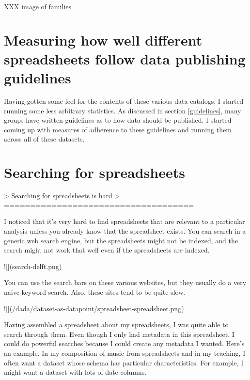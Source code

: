 \documentclass{acm_proc_article-sp}
\begin{document}
XXX image of families




\section{Measuring how well different spreadsheets follow data publishing guidelines}
Having gotten some feel for the contents of these various data catalogs,
I started running some less arbitrary statistics.
As discussed in section \ref{guidelines}, many groups have written guidelines
as to how data should be published.
\cite{open-data-census,fivestars,sunlight,sebastopol,odi}
I started coming up with measures of adherence to these guidelines and running
them across all of these datasets.










\section{Searching for spreadsheets}


















> Searching for spreadsheets is hard
> ====================================

I noticed that it's very hard to find spreadsheets that are relevant
to a particular analysis unless you already know that the spreadsheet exists.
You can search in a generic web search engine, but the spreadsheets might not
be indexed, and the search might not work that well even if the spreadsheets
are indexed.

![](search-delft.png)

You can use the search bars on these various websites, but they usually do a
very naive keyword search. Also, these sites tend to be quite slow.

![](/dada/dataset-as-datapoint/spreadsheet-spreadsheet.png)

Having assembled a spreadsheet about my spreadsheets, I was quite able to
search through them. Even though I only had metadata in this spreadsheet,
I could do powerful searches because I could create any metadata I wanted.
Here's an example. In my composition of music from spreadsheets and in my
teaching, I often want a dataset whose schema has particular characteristics.
For example, I might want a dataset with lots of date columns.
\end{document}
